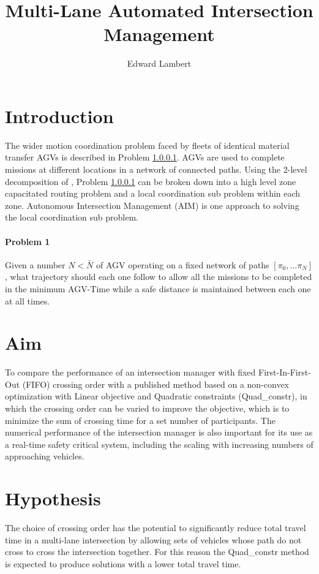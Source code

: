 \documentclass[11pt]{article} %
\author{Edward Lambert}
\title{Multi-Lane Automated Intersection Management}
\begin{document}
\maketitle
\section{Introduction}
The wider motion coordination problem faced by fleets of identical material transfer AGVs is described in Problem \ref{prob1}. AGVs are used to complete missions at different locations in a network of connected paths. Using the 2-level decomposition of \cite{Digani2015}, Problem \ref{prob1} can be broken down into a high level zone capacitated routing problem and a local coordination sub problem within each zone. Autonomous Intersection Management (AIM) is one approach to solving the local coordination sub problem.

\paragraph{Problem 1}
\label{prob1}
Given a number $N<\bar{N}$ of AGV operating on a fixed network of paths $[\pi_0, ... \pi_N]$, what trajectory should each one follow to allow all the missions to be completed in the minimum AGV-Time while a safe distance is maintained between each one at all times.

\section{Aim}
To compare the performance of an intersection manager with fixed First-In-First-Out (FIFO) crossing order with a published method based on a non-convex optimization with Linear objective and Quadratic constraints (Quad\_constr), in which the crossing order can be varied to improve the objective, which is to minimize the sum of crossing time for a set number of participants. The numerical performance of the intersection manager is also important for its use as a real-time safety critical system, including the scaling with increasing numbers of approaching vehicles. 

\section{Hypothesis}
The choice of crossing order has the potential to significantly reduce total travel time in a multi-lane intersection by allowing sets of vehicles whose path do not cross to cross the intersection together. For this reason the Quad\_constr method is expected to produce solutions with a lower total travel time.
\end{document}
